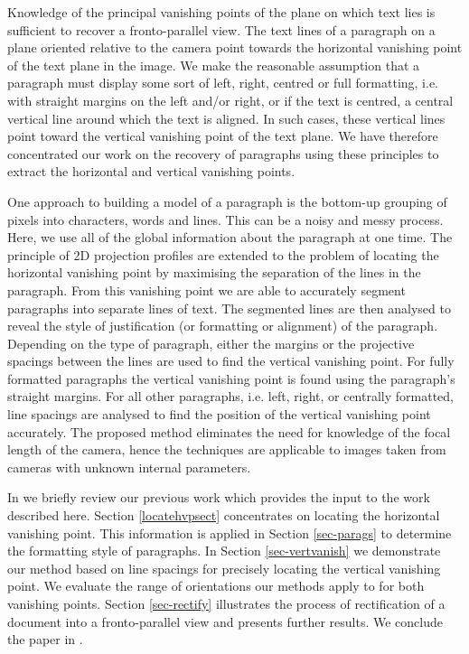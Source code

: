 \documentclass{elsart}   %
\begin{document}
Knowledge of the principal vanishing points of the plane on which text lies is
sufficient to recover a fronto-parallel view. The text lines of a paragraph
on a plane oriented relative to the camera  point towards
the horizontal vanishing point of the text plane in the image. We make the
reasonable assumption that a paragraph must display some sort of
 left,  right, centred or full  formatting, i.e. with straight margins on the
left and/or right, or if the text is centred, a central vertical line around which
the text is aligned.  In such cases, these vertical lines point toward the
vertical vanishing point of the text plane.  We have therefore concentrated our
work on the recovery of paragraphs using these principles to extract the
horizontal and vertical vanishing points. 

One approach to building a model of a paragraph is the bottom-up grouping of
pixels into characters, words and lines. This can be a noisy and messy
process. Here, we use all of the global information about the paragraph at one
time.  The principle of 2D projection profiles are extended to the problem of
locating the horizontal vanishing point by maximising the separation of the
lines in the paragraph.  From this vanishing point we are able to accurately
segment paragraphs into separate lines of text.  The segmented lines are then
analysed to reveal the style of justification (or formatting or alignment) of
the paragraph. Depending on the type of paragraph, either the margins or the
projective spacings between the lines are used to find the vertical vanishing
point. For fully formatted paragraphs the vertical vanishing point is found
using the paragraph's straight margins. For all other paragraphs, i.e. left,
right, or centrally formatted, line spacings are analysed to find the position
of the vertical vanishing point accurately. The proposed method eliminates the
need for knowledge of the focal length of the camera, hence the techniques are
applicable to images taken from cameras with unknown internal parameters.

 
In  we briefly review our previous work which
provides the input to the work described here.  Section \ref{locatehvpsect}
concentrates on locating the horizontal vanishing point. This information is
applied in Section \ref{sec-parags} to determine the formatting style of paragraphs.
In Section \ref{sec-vertvanish} we demonstrate our method based on line spacings
for precisely locating the vertical vanishing point. We evaluate the range of
orientations our methods apply to for both vanishing points. Section
\ref{sec-rectify} illustrates the process of rectification of a document into a
fronto-parallel view and presents further results. We conclude the paper in
.
\end{document}

